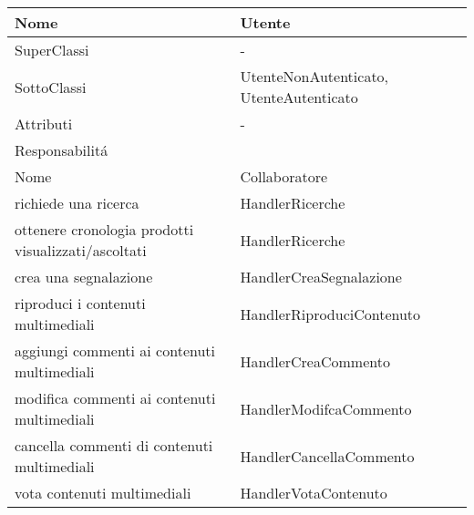 \begin{center}
    \begin{tabular}{ |p{3cm}|p{3cm}|p{3cm}|p{3cm}| }
        \hline
        Nome & \multicolumn{3}{|p{9cm}|}{Utente} \\\hline
        SuperClassi & \multicolumn{3}{|p{9cm}|}{-} \\\hline
        SottoClassi & \multicolumn{3}{|p{9cm}|}{UtenteNonAutenticato, UtenteAutenticato} \\\hline
        Attributi & \multicolumn{3}{|p{9cm}|}{-} \\\hline
        \multicolumn{4}{|p{12cm}|}{Responsabilit\'a} \\\hline
        \multicolumn{2}{|p{6cm}|}{Nome} & \multicolumn{2}{|p{6cm}|}{Collaboratore} \\\hline
        \multicolumn{2}{|p{6cm}|}{richiede una ricerca} & \multicolumn{2}{|p{6cm}|}{HandlerRicerche} \\\hline
        \multicolumn{2}{|p{6cm}|}{ottenere cronologia prodotti visualizzati/ascoltati} & \multicolumn{2}{|p{6cm}|}{HandlerRicerche} \\\hline
        \multicolumn{2}{|p{6cm}|}{crea una segnalazione} & \multicolumn{2}{|p{6cm}|}{HandlerCreaSegnalazione} \\\hline
        \multicolumn{2}{|p{6cm}|}{riproduci i contenuti multimediali} & \multicolumn{2}{|p{6cm}|}{HandlerRiproduciContenuto} \\\hline
        \multicolumn{2}{|p{6cm}|}{aggiungi commenti ai contenuti multimediali} & \multicolumn{2}{|p{6cm}|}{HandlerCreaCommento} \\\hline
        \multicolumn{2}{|p{6cm}|}{modifica commenti ai contenuti multimediali} & \multicolumn{2}{|p{6cm}|}{HandlerModifcaCommento} \\\hline
        \multicolumn{2}{|p{6cm}|}{cancella commenti di contenuti multimediali} & \multicolumn{2}{|p{6cm}|}{HandlerCancellaCommento} \\\hline
        \multicolumn{2}{|p{6cm}|}{vota contenuti multimediali} & \multicolumn{2}{|p{6cm}|}{HandlerVotaContenuto} \\\hline
    \end{tabular}
\end{center}

